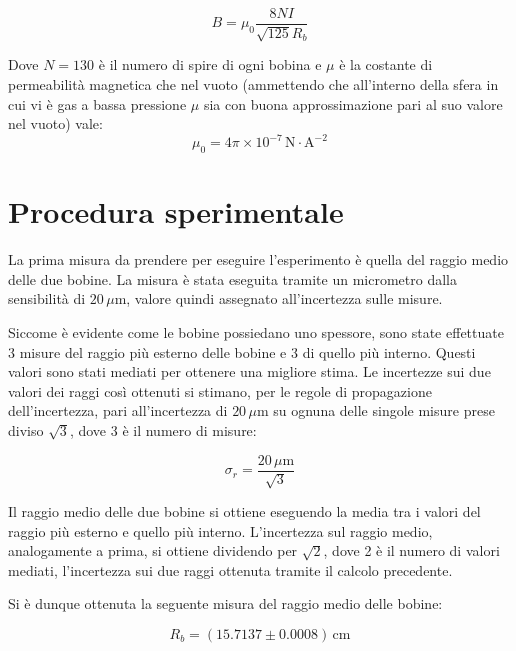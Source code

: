 \documentclass[a4paper,12pt]{article}
\begin{document}
\begin{equation}
    B = \mu_0 \frac{8NI}{\sqrt{125} R_b}
    \label{eq:campo_magnetico}
\end{equation}

Dove \( N = 130 \) è il numero di spire di ogni bobina e \( \mu \) è la costante di permeabilità magnetica che nel vuoto (ammettendo che all’interno della sfera in cui vi è gas a bassa pressione \( \mu \) sia con buona approssimazione pari al suo valore nel vuoto) vale:
\begin{equation}
    \mu_0 = 4 \pi \times 10^{-7} \, \text{N} \cdot \text{A}^{-2}
    \label{eq:permeabilita_magnetica}
\end{equation}

\section{Procedura sperimentale}

La prima misura da prendere per eseguire l’esperimento è quella del raggio medio delle due bobine. La misura è stata eseguita tramite un micrometro dalla sensibilità di \( 20 \, \mu\text{m} \), valore quindi assegnato all’incertezza sulle misure.

Siccome è evidente come le bobine possiedano uno spessore, sono state effettuate 3 misure del raggio più esterno delle bobine e 3 di quello più interno. Questi valori sono stati mediati per ottenere una migliore stima. Le incertezze sui due valori dei raggi così ottenuti si stimano, per le regole di propagazione dell’incertezza, pari all’incertezza di \( 20 \, \mu\text{m} \) su ognuna delle singole misure prese diviso \( \sqrt{3} \), dove 3 è il numero di misure:

\begin{equation}
    \sigma_r = \frac{20 \, \mu\text{m}}{\sqrt{3}}
    \label{eq:incertezza_raggi}
\end{equation}

Il raggio medio delle due bobine si ottiene eseguendo la media tra i valori del raggio più esterno e quello più interno. L’incertezza sul raggio medio, analogamente a prima, si ottiene dividendo per \( \sqrt{2} \), dove 2 è il numero di valori mediati, l’incertezza sui due raggi ottenuta tramite il calcolo precedente.

Si è dunque ottenuta la seguente misura del raggio medio delle bobine:

\begin{equation}
    R_b = (15.7137 \pm 0.0008) \, \text{cm}
    \label{eq:raggio_medio_bobine}
\end{equation}
\end{document}
